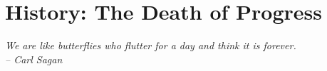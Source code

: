 \chapter{History: The Death of Progress}

{\itshape
We are like butterflies who flutter for a day and think it is forever.\\

-- Carl Sagan
}
